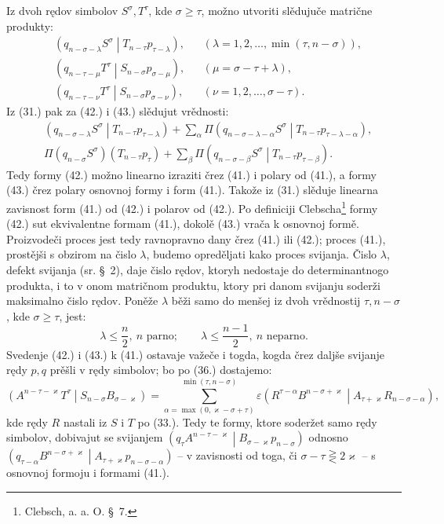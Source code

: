 \documentclass[11pt]{article}
\newcommand{\pair}[2]{\left(#1\middle|#2\right)}
\newcommand{\eps}{\varepsilon}
\begin{document}
Iz dvoh rędov simbolov $S^\sigma,T^\tau$, kde $\sigma\ge\tau$, možno utvoriti slědujuče matrične produkty:
\begin{align}
&\pair{q_{n-\sigma-\lambda}S^\sigma}{T_{n-\tau}p_{\tau-\lambda}},
&&(\lambda=1,2,\ldots,\min(\tau,n-\sigma)),\tag{41}\\
&\pair{q_{n-\tau-\mu}T^\tau}{S_{n-\sigma}p_{\sigma-\mu}},
&&(\mu=\sigma-\tau+\lambda),\tag{42}\\
&\pair{q_{n-\tau-\nu}T^\tau}{S_{n-\sigma}p_{\sigma-\nu}},
&&(\nu=1,2,\ldots,\sigma-\tau).
\tag{43}
\end{align}
Iz (31.) pak za (42.) i (43.) slědujut vrědnosti:
\begin{align}
&\pair{q_{n-\sigma-\lambda}S^\sigma}{T_{n-\tau}p_{\tau-\lambda}}
 +\sum_{\alpha}\Pi
 \pair{q_{n-\sigma-\lambda-\alpha}S^\sigma}
 {T_{n-\tau}p_{\tau-\lambda-\alpha}},\tag{42a}\\
&\Pi(q_{n-\sigma}S^\sigma)(T_{n-\tau}p_\tau)
 +\sum_{\beta}\Pi
 \pair{q_{n-\sigma-\beta}S^\sigma}{T_{n-\tau}p_{\tau-\beta}}.
\tag{43a}
\end{align}
Tedy formy (42.) možno linearno izraziti črez (41.) i polary od (41.), a formy (43.) črez polary osnovnoj formy i form (41.). Takože iz (31.) slěduje linearna zavisnost form (41.) od (42.) i polarov od (42.). Po definiciji Clebscha\footnote{Clebsch, a. a. O. \S\ 7.} formy (42.) sut ekvivalentne formam (41.), dokolě (43.) vrača k osnovnoj formě. Proizvodeči proces jest tedy ravnopravno dany črez (41.) ili (42.); proces (41.), prostějši s obzirom na čislo $\lambda$, budemo opreděljati kako proces svijanja. Čislo $\lambda$, defekt svijanja (sr. \S\ 2), daje čislo rędov, ktoryh nedostaje do determinantnogo produkta, i to v onom matričnom produktu, ktory pri danom svijanju soderži maksimalno čislo rędov. Poněže $\lambda$ běži samo do menšej iz dvoh vrědnostij $\tau,n-\sigma$, kde $\sigma\ge\tau$, jest:
\begin{equation}
 \lambda\le\frac n2,\ n\text{ parno};\qquad
 \lambda\le\frac{n-1}{2},\ n\text{ neparno}.
\tag{44}
\end{equation}
Svedenje (42.) i (43.) k (41.) ostavaje važeče i togda, kogda črez daljše svijanje rędy $p,q$ prěšli v rędy simbolov; bo po (36.) dostajemo:
\[
 \pair{A^{n-\tau-\varkappa}T^\tau}{S_{n-\sigma}B_{\sigma-\varkappa}}
 =\sum_{\alpha=\max(0,\varkappa-\sigma+\tau)}^{\min(\tau,n-\sigma)}
 \eps\pair{R^{\tau-\alpha}B^{n-\sigma+\varkappa}}
 {A_{\tau+\varkappa}R_{n-\sigma-\alpha}},
\]
kde rędy $R$ nastali iz $S$ i $T$ po (33.). Tedy te formy, ktore soderžet samo rędy simbolov, dobivajut se svijanjem $\pair{q_\tau A^{n-\tau-\varkappa}}{B_{\sigma-\varkappa}p_{n-\sigma}}$ odnosno $\pair{q_{\tau-\alpha}B^{n-\sigma+\varkappa}}{A_{\tau+\varkappa}p_{n-\sigma-\alpha}}$ -- v zavisnosti od toga, či $\sigma-\tau\gtreqless 2\varkappa$ -- s osnovnoj formoju i formami (41.).
\end{document}
